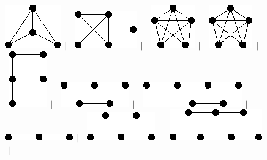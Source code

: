 \documentclass[11pt,paper=b5,footinclude,headinclude]{scrbook} %
\newtheorem{ex}{Vaja\hypertarget{sol:\theex}}[chapter]
\begin{document}
\begin{ex}
\begin{figure}
\includegraphics[scale=0.5]{smallGraphs/g_K4.png}$\,\mid\,$\
\includegraphics[scale=0.5]{smallGraphs/g_K4UK1.png}$\,\mid\,$\
\includegraphics[scale=0.5]{smallGraphs/g_K5-e.png}$\,\mid\,$\
\includegraphics[scale=0.5]{smallGraphs/g_K5.png}$\,\mid\,$\
\includegraphics[scale=0.5]{smallGraphs/g_P.png}$\,\mid\,$\
\includegraphics[scale=0.5]{smallGraphs/g_P2UP3.png}$\,\mid\,$\
\includegraphics[scale=0.5]{smallGraphs/g_P2UP4.png}$\,\mid\,$\
\includegraphics[scale=0.5]{smallGraphs/g_P3.png}$\,\mid\,$\
\includegraphics[scale=0.5]{smallGraphs/g_P3U2K1.png}$\,\mid\,$\
\includegraphics[scale=0.5]{smallGraphs/g_P3UP4.png}$\,\mid\,$\

\end{figure}
\end{ex}
\end{document}

